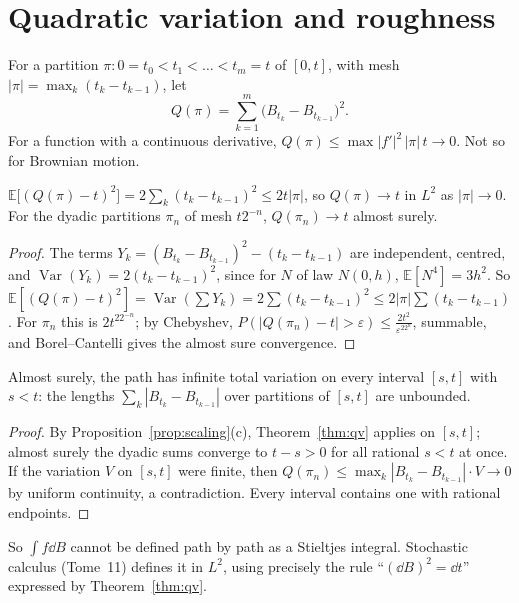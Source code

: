 \section{Quadratic variation and roughness}

For a partition $\pi:0=t_0<t_1<\dots<t_m=t$ of $[0,t]$, with mesh $|\pi|=\max_k(t_k-t_{k-1})$, let
\[
Q(\pi)=\sum_{k=1}^m\bigl(B_{t_k}-B_{t_{k-1}}\bigr)^2.
\]
For a function with a continuous derivative, $Q(\pi)\le\max|f'|^2\,|\pi|\,t\to0$. Not so for Brownian motion.

\begin{theorem}\label{thm:qv}
$\mathbb E\bigl[(Q(\pi)-t)^2\bigr]=2\sum_k(t_k-t_{k-1})^2\le2t|\pi|$, so $Q(\pi)\to t$ in $L^2$ as $|\pi|\to0$. For the dyadic partitions $\pi_n$ of mesh $t2^{-n}$, $Q(\pi_n)\to t$
almost surely.
\end{theorem}
\begin{proof}
The terms $Y_k=(B_{t_k}-B_{t_{k-1}})^2-(t_k-t_{k-1})$ are independent, centred, and $\operatorname{Var}(Y_k)=2(t_k-t_{k-1})^2$, since for $N$ of law $N(0,h)$, $\mathbb E[N^4]=3h^2$. So
$\mathbb E[(Q(\pi)-t)^2]=\operatorname{Var}(\sum Y_k)=2\sum(t_k-t_{k-1})^2\le2|\pi|\sum(t_k-t_{k-1})$. For $\pi_n$ this is $2t^22^{-n}$; by Chebyshev, $P(|Q(\pi_n)-t|>\varepsilon)\le\frac{2t^2}{\varepsilon^22^n}$,
summable, and Borel--Cantelli gives the almost sure convergence.
\end{proof}

\begin{corollary}\label{cor:variation}
Almost surely, the path has infinite total variation on every interval $[s,t]$ with $s<t$: the lengths $\sum_k|B_{t_k}-B_{t_{k-1}}|$ over partitions of $[s,t]$ are
unbounded.
\end{corollary}
\begin{proof}
By Proposition~\ref{prop:scaling}(c), Theorem~\ref{thm:qv} applies on $[s,t]$; almost surely the dyadic sums converge to $t-s>0$ for all rational $s<t$ at once. If
the variation $V$ on $[s,t]$ were finite, then $Q(\pi_n)\le\max_k|B_{t_k}-B_{t_{k-1}}|\cdot V\to0$ by uniform continuity, a contradiction. Every interval contains one
with rational endpoints.
\end{proof}

So $\int f\dd B$ cannot be defined path by path as a Stieltjes integral. Stochastic calculus (Tome~11) defines it in $L^2$,
using precisely the rule ``$(\dd B)^2=\dd t$'' expressed by Theorem~\ref{thm:qv}.

